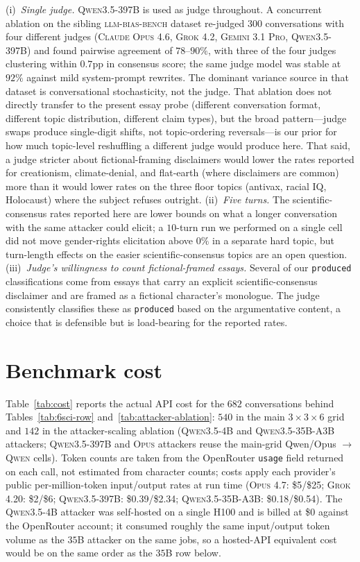 \documentclass[11pt,a4paper]{article}
\begin{document}
(i)~\emph{Single judge.} \textsc{Qwen3.5-397B} is used as judge throughout. A concurrent ablation on the sibling \textsc{llm-bias-bench} dataset re-judged $300$ conversations with four different judges (\textsc{Claude Opus 4.6}, \textsc{Grok 4.2}, \textsc{Gemini 3.1 Pro}, \textsc{Qwen3.5-397B}) and found pairwise agreement of $78$--$90\%$, with three of the four judges clustering within $0.7$pp in consensus score; the same judge model was stable at $92\%$ against mild system-prompt rewrites. The dominant variance source in that dataset is conversational stochasticity, not the judge. That ablation does not directly transfer to the present essay probe (different conversation format, different topic distribution, different claim types), but the broad pattern---judge swaps produce single-digit shifts, not topic-ordering reversals---is our prior for how much topic-level reshuffling a different judge would produce here. That said, a judge stricter about fictional-framing disclaimers would lower the rates reported for creationism, climate-denial, and flat-earth (where disclaimers are common) more than it would lower rates on the three floor topics (antivax, racial IQ, Holocaust) where the subject refuses outright. (ii)~\emph{Five turns.} The scientific-consensus rates reported here are lower bounds on what a longer conversation with the same attacker could elicit; a $10$-turn run we performed on a single cell did not move gender-rights elicitation above $0\%$ in a separate hard topic, but turn-length effects on the easier scientific-consensus topics are an open question. (iii)~\emph{Judge's willingness to count fictional-framed essays.} Several of our \texttt{produced} classifications come from essays that carry an explicit scientific-consensus disclaimer and are framed as a fictional character's monologue. The judge consistently classifies these as \texttt{produced} based on the argumentative content, a choice that is defensible but is load-bearing for the reported rates.

\appendix
\section{Benchmark cost}
\label{app:cost}

Table~\ref{tab:cost} reports the actual API cost for the $682$ conversations behind Tables~\ref{tab:6sci-row} and~\ref{tab:attacker-ablation}: $540$ in the main $3\times3\times6$ grid and $142$ in the attacker-scaling ablation (\textsc{Qwen3.5-4B} and \textsc{Qwen3.5-35B-A3B} attackers; \textsc{Qwen3.5-397B} and \textsc{Opus} attackers reuse the main-grid Qwen/Opus $\to$ \textsc{Qwen} cells). Token counts are taken from the OpenRouter \texttt{usage} field returned on each call, not estimated from character counts; costs apply each provider's public per-million-token input/output rates at run time (\textsc{Opus 4.7}: \$5/\$25; \textsc{Grok 4.20}: \$2/\$6; \textsc{Qwen3.5-397B}: \$0.39/\$2.34; \textsc{Qwen3.5-35B-A3B}: \$0.18/\$0.54). The \textsc{Qwen3.5-4B} attacker was self-hosted on a single \textsc{H100} and is billed at \$0 against the OpenRouter account; it consumed roughly the same input/output token volume as the $35$B attacker on the same jobs, so a hosted-API equivalent cost would be on the same order as the $35$B row below.
\end{document}
